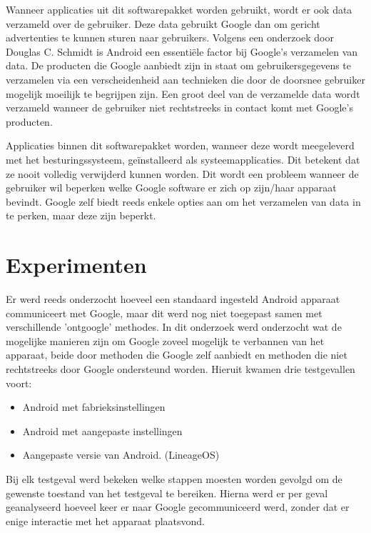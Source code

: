 \documentclass[a0,portrait]{a0poster}
\begin{document}
\begin{multicols}{2}
Wanneer applicaties uit dit softwarepakket worden gebruikt, wordt er ook data verzameld over de gebruiker. Deze data gebruikt Google dan om gericht advertenties te kunnen sturen naar gebruikers. Volgens een onderzoek door Douglas C. Schmidt is Android een essentiële factor bij Google's verzamelen van data. De producten die Google aanbiedt zijn in staat om gebruikersgegevens te verzamelen via een verscheidenheid aan technieken die door de doorsnee gebruiker mogelijk moeilijk te begrijpen zijn. Een groot deel van de verzamelde data wordt verzameld wanneer de gebruiker niet rechtstreeks in contact komt met Google's producten. 

Applicaties binnen dit softwarepakket worden, wanneer deze wordt meegeleverd met het besturingssysteem, geïnstalleerd als systeemapplicaties. Dit betekent dat ze nooit volledig verwijderd kunnen worden. Dit wordt een probleem wanneer de gebruiker wil beperken welke Google software er zich op zijn/haar apparaat bevindt. Google zelf biedt reeds enkele opties aan om het verzamelen van data in te perken, maar deze zijn beperkt.

\color{Black} %
\color{HoGentAccent1} 
\section*{Experimenten}
\color{black}
Er werd reeds onderzocht hoeveel een standaard ingesteld Android apparaat communiceert met Google, maar dit werd nog niet toegepast samen met verschillende 'ontgoogle' methodes. In dit onderzoek werd onderzocht wat de mogelijke manieren zijn om Google zoveel mogelijk te verbannen van het apparaat, beide door methoden die Google zelf aanbiedt en methoden die niet rechtstreeks door Google ondersteund worden. Hieruit kwamen drie testgevallen voort: 
\begin{itemize}
    \item Android met fabrieksinstellingen
    \item Android met aangepaste instellingen 
    \item Aangepaste versie van Android. (LineageOS)
\end{itemize}

Bij elk testgeval werd bekeken welke stappen moesten worden gevolgd om de gewenste toestand van het testgeval te bereiken. Hierna werd er per geval geanalyseerd hoeveel keer er naar Google gecommuniceerd werd, zonder dat er enige interactie met het apparaat plaatsvond. 


\end{multicols}
\end{document}
